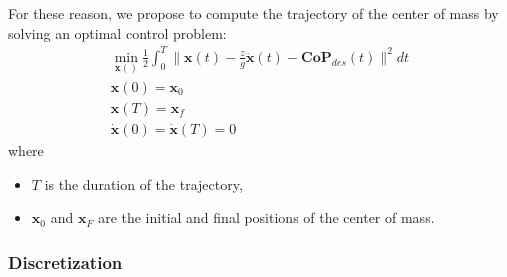 \documentclass{article}
\newcommand\vect[1]{\mathbf{#1}}
\newcommand\x{\vect{x}}
\newcommand\dx{\vect{\dot{x}}}
\newcommand\ddx{\vect{\ddot{x}}}
\begin{document}
For these reason, we propose to compute the trajectory of the center of mass by solving an optimal control problem:
\begin{equation}
  \begin{array}{l}
    \min_{\x()}\frac{1}{2}\int_0^T \|\x(t) - \frac{z}{g}\ddx(t) - \vect{CoP}_{des}(t)\|^2 dt\\
    \x(0)=\x_0\\
    \x(T)=\x_f\\
    \dx(0)=\dx(T)=0
  \end{array}
    \label{eq:optimal-control}
\end{equation}
where
\begin{itemize}
\item $T$ is the duration of the trajectory,
\item $\x_0$ and $\x_F$ are the initial and final positions of the center of mass.
\end{itemize}

\subsubsection{Discretization}
\end{document}

